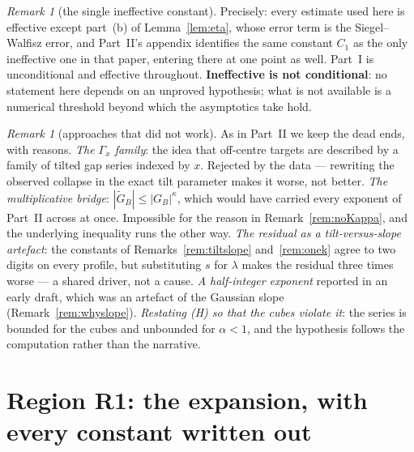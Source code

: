 \documentclass[11pt,a4paper]{article}
\theoremstyle{plain}
\theoremstyle{definition}
\theoremstyle{remark}
\newtheorem{remark}[theorem]{Remark}
\begin{document}
\begin{remark}[the single ineffective constant]\label{rem:oneconstant}
Precisely: every estimate used here is effective except part~(b) of Lemma~\ref{lem:eta}, whose
error term is the Siegel--Walfisz error, and Part~II's appendix identifies the same constant
$C_1$ as the only ineffective one in that paper, entering there at one point as well. Part~I
is unconditional and effective throughout. \textbf{Ineffective is not conditional}: no
statement here depends on an unproved hypothesis; what is not available is a numerical
threshold beyond which the asymptotics take hold.
\end{remark}

\begin{remark}[approaches that did not work]\label{rem:graveyard}
As in Part~II we keep the dead ends, with reasons. \emph{The $\Gamma_x$ family}: the idea that
off-centre targets are described by a family of tilted gap series indexed by $x$. Rejected by
the data --- rewriting the observed collapse in the exact tilt parameter makes it worse, not
better. \emph{The multiplicative bridge}: $|\widetilde G_B|\le|G_B|^{\kappa}$, which would have
carried every exponent of Part~II across at once. Impossible for the reason in
Remark~\ref{rem:noKappa}, and the underlying inequality runs the other way. \emph{The residual
as a tilt-versus-slope artefact}: the constants of Remarks~\ref{rem:tiltslope}
and~\ref{rem:onek} agree to two digits on every profile, but substituting $s$ for $\lambda$
makes the residual three times worse --- a shared driver, not a cause. \emph{A half-integer
exponent} reported in an early draft, which was an artefact of the Gaussian slope
(Remark~\ref{rem:whyslope}). \emph{Restating \textup{(H)} so that the cubes violate it}: the
series is bounded for the cubes and unbounded for $\alpha<1$, and the hypothesis follows the
computation rather than the narrative.
\end{remark}

\appendix

\section{Region \textup{R1}: the expansion, with every constant written out}\label{app:R1}
\end{document}

